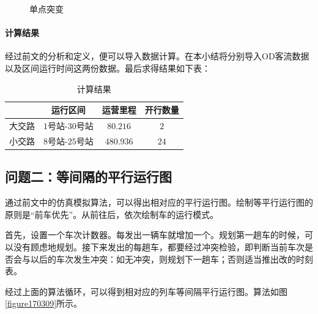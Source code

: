 \begin{enumerate}
\begin{itemize}
\begin{figure}[h]
            \caption{单点突变}
            \label{figure170202}
        \end{figure}
    \end{itemize}
\end{enumerate}


\paragraph{计算结果}

经过前文的分析和定义，便可以导入数据计算。在本小结将分别导入OD客流数据以及区间运行时间这两份数据。最后求得结果如下表：

\begin{table}[h]
    \centering
    \caption{计算结果}
    \begin{tabular}{cccc}
    \hline
        & 运行区间     & 运营里程   & 开行数量 \\ \hline
    大交路 & $1$号站-$30$号站 & $80.216$ & $2$    \\
    小交路 & $8$号站-$25$号站 & $480.936$ & $24$   \\ \hline
    \end{tabular}
\end{table}


\subsection{问题二：等间隔的平行运行图}

通过前文中的仿真模拟算法，可以得出相对应的平行运行图。绘制等平行运行图的原则是“前车优先”。从前往后，依次绘制车的运行模式。

首先，设置一个车次计数器。每发出一辆车就增加一个。规划第一趟车的时候，可以没有顾虑地规划。接下来发出的每趟车，都要经过冲突检验，即判断当前车次是否会与以后的车次发生冲突：如无冲突，则规划下一趟车；否则适当推出改的时刻表。

经过上面的算法循环，可以得到相对应的列车等间隔平行运行图。算法如图\ref{figure170309}所示。

